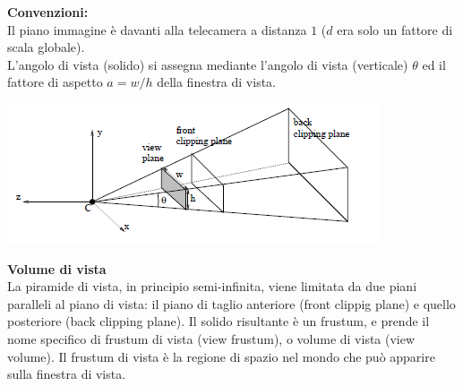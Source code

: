 \documentclass[a4paper, 10pt]{article}
\begin{document}
		\begin{multicols}{2}
			\noindent
			\textbf{Convenzioni:}\\
			Il piano immagine è davanti alla telecamera a distanza $ 1 $ ($ d $ era solo un fattore di scala globale).\\
			L’angolo di vista (solido) si assegna mediante l’angolo di vista (verticale) $ \theta $ ed il fattore di aspetto $ a = w/h $ della finestra di vista.
			
			\columnbreak
			
			\includegraphics[scale=0.5]{pipelineg3}
			
		\end{multicols}
	
		\noindent
		\textbf{Volume di vista}\\
		La piramide di vista, in principio semi-infinita, viene limitata da due piani paralleli al piano di vista: il piano di taglio anteriore (front clippig plane) e quello posteriore (back clipping plane). Il solido risultante è un frustum, e prende il nome specifico di frustum di vista (view frustum), o volume di vista (view volume). Il frustum di vista è la regione di spazio nel mondo che può apparire sulla finestra di vista.
		
\end{document}
